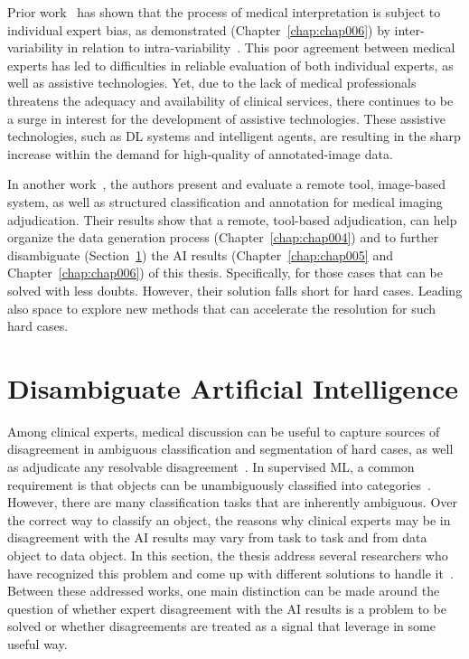 Prior work~\cite{MIRANDA2015334} has shown that the process of medical interpretation is subject to individual expert bias, as demonstrated (Chapter~\ref{chap:chap006}) by inter-variability in relation to intra-variability~\cite{NIAZI2019e253}.
This poor agreement between medical experts has led to difficulties in reliable evaluation of both individual experts, as well as assistive technologies.
Yet, due to the lack of medical professionals threatens the adequacy and availability of clinical services, there continues to be a surge in interest for the development of assistive technologies.
These assistive technologies, such as \ac{DL} systems and intelligent agents, are resulting in the sharp increase within the demand for high-quality of annotated-image data.

In another work~\cite{10.1167/tvst.8.6.40}, the authors present and evaluate a remote tool, image-based system, as well as structured classification and annotation for medical imaging adjudication.
Their results show that a remote, tool-based adjudication, can help organize the data generation process (Chapter~\ref{chap:chap004}) and to further disambiguate (Section~\ref{sec:chap003006}) the \ac{AI} results (Chapter~\ref{chap:chap005} and Chapter~\ref{chap:chap006}) of this thesis.
Specifically, for those cases that can be solved with less doubts.
However, their solution falls short for hard cases.
Leading also space to explore new methods that can accelerate the resolution for such hard cases.

\section{Disambiguate Artificial Intelligence}
\label{sec:chap003006}

Among clinical experts, medical discussion can be useful to capture sources of disagreement in ambiguous classification and segmentation of hard cases, as well as adjudicate any resolvable disagreement~\cite{10.1145/3308560.3317085}.
In supervised \ac{ML}, a common requirement is that objects can be unambiguously classified into categories~\cite{castro2020causality}.
However, there are many classification tasks that are inherently ambiguous.
Over the correct way to classify an object, the reasons why clinical experts may be in disagreement with the \ac{AI} results may vary from task to task and from data object to data object.
In this section, the thesis address several researchers who have recognized this problem and come up with different solutions to handle it~\cite{10.1145/3313831.3376506, 10.1145/3313831.3376590, Tschandl2020}.
Between these addressed works, one main distinction can be made around the question of whether expert disagreement with the \ac{AI} results is a problem to be solved or whether disagreements are treated as a signal that leverage in some useful way.

